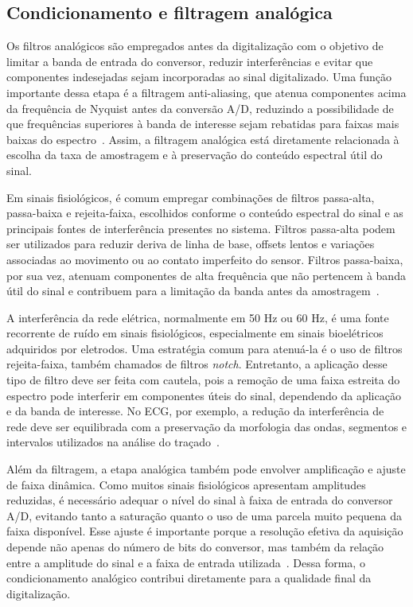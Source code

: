 \documentclass[a4paper,12pt]{fcte}
\begin{document}
\subsection{Condicionamento e filtragem analógica}

Os filtros analógicos são empregados antes da digitalização com o objetivo de limitar a banda de entrada do conversor, reduzir interferências e evitar que componentes indesejadas sejam incorporadas ao sinal digitalizado. Uma função importante dessa etapa é a filtragem anti-aliasing, que atenua componentes acima da frequência de Nyquist antes da conversão A/D, reduzindo a possibilidade de que frequências superiores à banda de interesse sejam rebatidas para faixas mais baixas do espectro~\cite{kester2008mt002}. Assim, a filtragem analógica está diretamente relacionada à escolha da taxa de amostragem e à preservação do conteúdo espectral útil do sinal.

Em sinais fisiológicos, é comum empregar combinações de filtros passa-alta, passa-baixa e rejeita-faixa, escolhidos conforme o conteúdo espectral do sinal e as principais fontes de interferência presentes no sistema. Filtros passa-alta podem ser utilizados para reduzir deriva de linha de base, offsets lentos e variações associadas ao movimento ou ao contato imperfeito do sensor. Filtros passa-baixa, por sua vez, atenuam componentes de alta frequência que não pertencem à banda útil do sinal e contribuem para a limitação da banda antes da amostragem~\cite{chu2023ecgsystem,ardeti2023ecg}.

A interferência da rede elétrica, normalmente em 50 Hz ou 60 Hz, é uma fonte recorrente de ruído em sinais fisiológicos, especialmente em sinais bioelétricos adquiridos por eletrodos. Uma estratégia comum para atenuá-la é o uso de filtros rejeita-faixa, também chamados de filtros \textit{notch}. Entretanto, a aplicação desse tipo de filtro deve ser feita com cautela, pois a remoção de uma faixa estreita do espectro pode interferir em componentes úteis do sinal, dependendo da aplicação e da banda de interesse. No ECG, por exemplo, a redução da interferência de rede deve ser equilibrada com a preservação da morfologia das ondas, segmentos e intervalos utilizados na análise do traçado~\cite{ardeti2023ecg,raus2025ecg_testing}.

Além da filtragem, a etapa analógica também pode envolver amplificação e ajuste de faixa dinâmica. Como muitos sinais fisiológicos apresentam amplitudes reduzidas, é necessário adequar o nível do sinal à faixa de entrada do conversor A/D, evitando tanto a saturação quanto o uso de uma parcela muito pequena da faixa disponível. Esse ajuste é importante porque a resolução efetiva da aquisição depende não apenas do número de bits do conversor, mas também da relação entre a amplitude do sinal e a faixa de entrada utilizada~\cite{kester2008mt001}. Dessa forma, o condicionamento analógico contribui diretamente para a qualidade final da digitalização.
\end{document}
